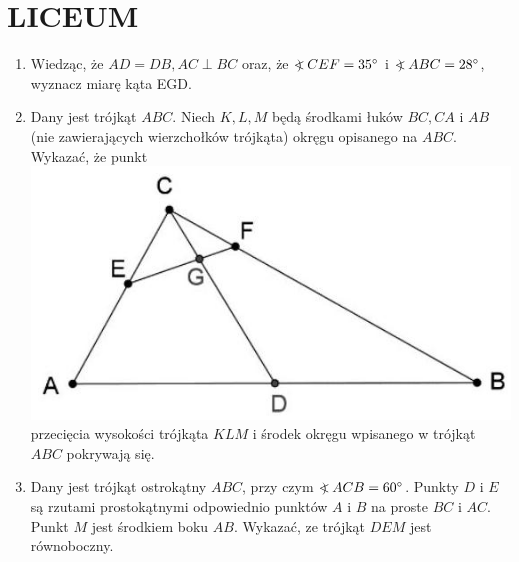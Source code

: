 \documentclass[10pt]{article}
\newcommand\Varangle{\mathop{{<\!\!\!\!\!\text{\small)}}\:}\nolimits}
\begin{document}
\section*{LICEUM}
\begin{enumerate}
  \item Wiedząc, że \(A D=D B, A C \perp B C\) oraz, że \(\Varangle C E F=35^{\circ}\) i \(\Varangle A B C=28^{\circ}\), wyznacz miarę kąta EGD.
  \item Dany jest trójkąt \(A B C\). Niech \(K, L, M\) będą środkami łuków \(B C, C A\) i \(A B\) (nie zawierających wierzchołków trójkąta) okręgu opisanego na \(A B C\). Wykazać, że punkt\\
\includegraphics[max width=\textwidth, center]{2024_11_21_832da7521aa701459acfg-1}\\
przecięcia wysokości trójkąta \(K L M\) i środek okręgu wpisanego w trójkąt \(A B C\) pokrywają się.
  \item Dany jest trójkąt ostrokątny \(A B C\), przy czym \(\Varangle A C B=60^{\circ}\). Punkty \(D\) i \(E\) są rzutami prostokątnymi odpowiednio punktów \(A\) i \(B\) na proste \(B C\) i \(A C\). Punkt \(M\) jest środkiem boku \(A B\). Wykazać, ze trójkąt \(D E M\) jest równoboczny.
\end{enumerate}
\end{document}
